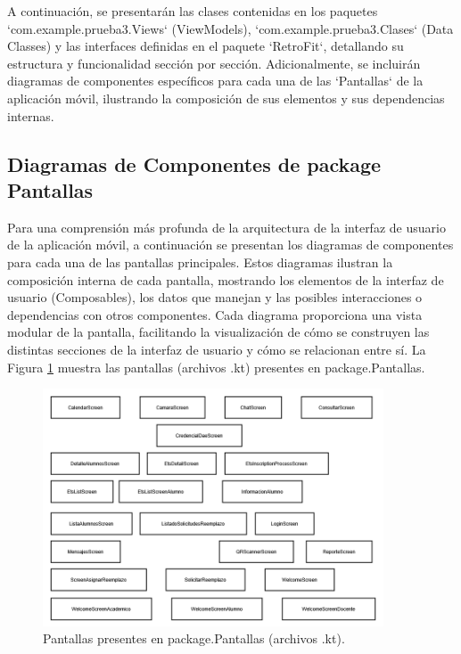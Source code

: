A continuación, se presentarán las clases contenidas en los paquetes `com.example.prueba3.Views` (ViewModels), `com.example.prueba3.Clases` (Data Classes) y las interfaces definidas en el paquete `RetroFit`, detallando su estructura y funcionalidad sección por sección. Adicionalmente, se incluirán diagramas de componentes específicos para cada una de las `Pantallas` de la aplicación móvil, ilustrando la composición de sus elementos y sus dependencias internas.

\newpage

\subsection{Diagramas de Componentes de package Pantallas}

Para una comprensión más profunda de la arquitectura de la interfaz de usuario de la aplicación móvil, a continuación se presentan los diagramas de componentes para cada una de las pantallas principales. Estos diagramas ilustran la composición interna de cada pantalla, mostrando los elementos de la interfaz de usuario (Composables), los datos que manejan y las posibles interacciones o dependencias con otros componentes. Cada diagrama proporciona una vista modular de la pantalla, facilitando la visualización de cómo se construyen las distintas secciones de la interfaz de usuario y cómo se relacionan entre sí. La Figura \ref{fig:Pantallas} muestra las pantallas (archivos .kt) presentes en package.Pantallas.

\begin{figure}[htbp!]
	\begin{center}
		\includegraphics[width=0.9\textwidth]{DiagramasMoviles/DCM (12)}
		\caption{Pantallas presentes en package.Pantallas (archivos .kt).}
		\label{fig:Pantallas}
	\end{center}
\end{figure}



